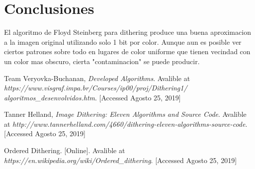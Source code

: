 \documentclass[conference]{IEEEtran}
\begin{document}
\section{Conclusiones}

El algoritmo de Floyd Steinberg  para dithering produce una buena aproximacion a la imagen original
utilizando solo 1 bit por color. Aunque aun es posible ver ciertos patrones sobre todo en lugares
de color uniforme que tienen vecindad con un color mas obscuro, cierta "contaminacion" se puede producir.


\begin{thebibliography}{00}
 Team Veryovka-Buchanan, \textit{Developed Algorithms}. Avalible at \textit{https://www.visgraf.impa.br/Courses/ip00/proj/Dithering1/\\algoritmos\_desenvolvidos.htm}. [Accessed Agosto 25, 2019]

 Tanner Helland, \textit{Image Dithering: Eleven Algorithms and Source Code}. Avalible at \textit{http://www.tannerhelland.com/4660/dithering-eleven-algorithms-source-code}. [Accessed Agosto 25, 2019]

 Ordered Dithering. [Online]. Avalible at \textit{https://en.wikipedia.org/wiki/Ordered\_dithering}. [Accessed Agosto 25, 2019]
\end{thebibliography}


\end{document}
